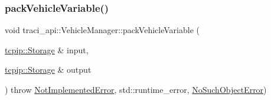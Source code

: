 \subsubsection{\texorpdfstring{pack\+Vehicle\+Variable()}{packVehicleVariable()}}
{\footnotesize\ttfamily void traci\+\_\+api\+::\+Vehicle\+Manager\+::pack\+Vehicle\+Variable (\begin{DoxyParamCaption}\item[{\hyperlink{classtcpip_1_1_storage}{tcpip\+::\+Storage} \&}]{input,  }\item[{\hyperlink{classtcpip_1_1_storage}{tcpip\+::\+Storage} \&}]{output }\end{DoxyParamCaption}) throw  \hyperlink{classtraci__api_1_1_not_implemented_error}{Not\+Implemented\+Error},  std\+::runtime\+\_\+error, \hyperlink{classtraci__api_1_1_no_such_object_error}{No\+Such\+Object\+Error}) }

